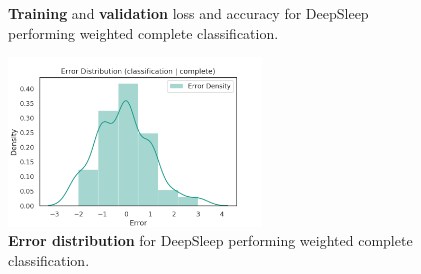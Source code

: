 \documentclass[11pt]{scrartcl}
\begin{document}
\begin{figure}[!hbt]
	\caption{\textcolor{viridis9}{\textbf{Training}} and \textcolor{viridis0}{\textbf{validation}} loss and accuracy for DeepSleep performing weighted complete classification.}
\end{figure}

\begin{figure}[hbt]
	\centering
	\includegraphics[width=0.6\textwidth,center]{img/learning/original_physionet_sleepnet_classification_complete_none_weighted_error_distribution.png}
	\caption{\textcolor{viridis5}{\textbf{Error distribution}} for DeepSleep performing weighted complete classification.}
	\label{fig:original_physionet_sleepnet_classification_complete_none_weighted_error_distribution}
\end{figure}
\end{document}
